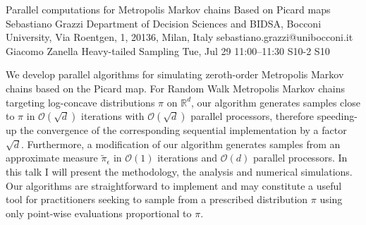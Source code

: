 \begin{talk}
  {Parallel computations for Metropolis Markov chains Based on Picard maps}%
  {Sebastiano Grazzi}%
  {Department of Decision Sciences and BIDSA, Bocconi University, Via Roentgen, 1, 20136, Milan, Italy}%
  {sebastiano.grazzi@unibocconi.it}%
  {Giacomo Zanella}%
  {Heavy-tailed Sampling}%
  {Tue, Jul 29 11:00–11:30}%
  {S10-2}%
  {S10}%
				
			

 We develop parallel algorithms for simulating zeroth-order Metropolis Markov chains based on the Picard map. 
For Random Walk Metropolis Markov chains targeting log-concave distributions $\pi$ on $\mathbb{R}^d$, our algorithm  
generates samples %
close to $\pi$ %
in $\mathcal{O}(\sqrt{d})$ iterations with $\mathcal{O}(\sqrt{d})$ parallel processors, 
therefore speeding-up the convergence of the corresponding sequential implementation by a factor $\sqrt{d}$. Furthermore, a modification of our algorithm generates samples from an approximate measure $\tilde \pi_\epsilon$ in $\mathcal{O}(1)$ iterations and $\mathcal{O}(d)$ parallel processors. In this talk I will present the methodology, the analysis and numerical simulations. Our algorithms are straightforward to implement and may constitute a useful tool for practitioners seeking to sample from a prescribed distribution $\pi$ using only point-wise evaluations proportional to $\pi$.
\end{talk}

